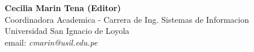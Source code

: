 \begin{center}
\textbf{Cecilia Marin Tena (Editor)} \\
Coordinadora Academica - Carrera de Ing. Sistemas de Informacion \\
Universidad San Ignacio de Loyola \\
email: \textit{cmarin@usil.edu.pe} \\
\end{center}
